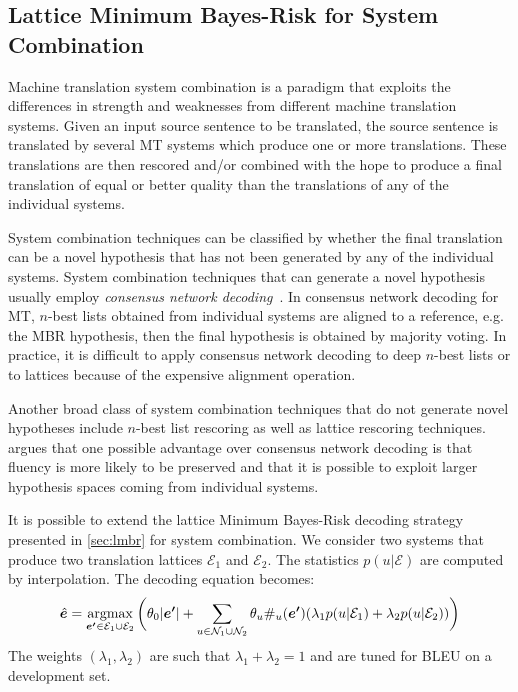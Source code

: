 \subsection{Lattice Minimum Bayes-Risk for System Combination}
\label{sec:lmbrSysComb}

Machine translation system combination is a paradigm that exploits
the differences in strength and weaknesses from different
machine translation systems. Given an input source sentence to be
translated, the source sentence is translated by several MT systems
which produce one or more translations. These translations
are then rescored and/or combined with the hope to produce
a final translation of equal or better quality than the translations
of any of the individual systems.

System combination techniques can be classified
by whether the final translation can be a novel hypothesis
that has not been generated by any of the individual systems.
System combination techniques that can generate
a novel hypothesis usually employ
\emph{consensus network decoding}~\citep{fiscus:1997:ASRU}.
In consensus network decoding for MT, $n$-best lists
obtained from individual systems are aligned to
a reference, e.g. the MBR hypothesis, then the final
hypothesis is obtained by majority voting.
In practice, it is difficult to apply consensus network
decoding to deep $n$-best lists or to lattices because
of the expensive alignment operation.

Another broad class of system combination techniques
that do not generate novel hypotheses
include $n$-best list rescoring as well as lattice rescoring techniques.
\citet{blackwood:2010:PHD} argues that one possible advantage over
consensus network decoding
is that fluency is more likely to be preserved and that
it is possible to exploit larger hypothesis spaces coming
from individual systems.

It is possible to extend the lattice Minimum Bayes-Risk decoding strategy
presented in \autoref{sec:lmbr} for system combination.
We consider two systems that produce two translation lattices
$\mathcal{E}_1$ and $\mathcal{E}_2$. The statistics
$p(u|\mathcal{E})$ are computed by interpolation. The decoding equation becomes:
%
\begin{equation}
  \hat{\bm{e}}=\operatorname*{argmax}_{\bm{e'} \in \mathcal{E}_1 \cup \mathcal{E}_2 } \bigg ( \theta_0|\bm{e'}|+\sum_{u \in \mathcal{N}_1 \cup \mathcal{N}_2}  \theta_u\#_u(\bm{e'}) (\lambda_{1} p(u|\mathcal{E}_1) + \lambda_2 p(u|\mathcal{E}_2)) \bigg )
\end{equation}
%
The weights $(\lambda_1,\lambda_2)$ are such that $\lambda_1+\lambda_2 = 1$ and are tuned for BLEU on a development set.

